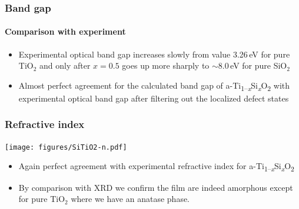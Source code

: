 \documentclass[noamsthm,8pt,t]{beamer}
\def\TiSiO{Ti\textsubscript{1--\itshape x}Si\textsubscript{\itshape x}O\textsubscript{2}}
\begin{document}
\begin{frame}
   \frametitle{Band gap}
   \framesubtitle{Comparison with experiment}

   \begin{center}
   \end{center}

   \begin{itemize}
      \item Experimental optical band gap increases slowly from value 3.26\,eV for pure TiO$_2$ and only after $x = 0.5$ goes up more sharply to $\sim$8.0\,eV for pure SiO$_2$
      \item<2> Almost perfect agreement for the calculated band gap of a-\TiSiO{} with experimental optical band gap after filtering out the localized defect states
   \end{itemize}
\end{frame}

\begin{frame}
\frametitle{Refractive index}
   \vspace{-0.4cm}
   \begin{center}
      \texttt{[image: figures/SiTiO2-n.pdf]}
   \end{center}
   \vspace{-0.3cm}
   \begin{itemize}
      \item Again perfect agreement with experimental refractive index for a-\TiSiO{}
      \item<2> By comparison with XRD we confirm the film are indeed amorphous except for pure TiO$_2$ where we have an anatase phase.
   \end{itemize}

   \begin{center}
   \end{center}

\end{frame}
\end{document}
